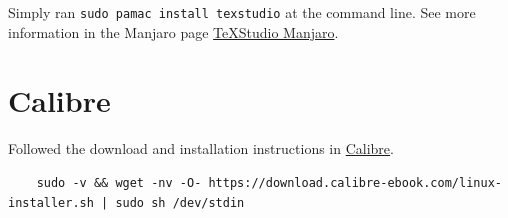 \documentclass[]{scrartcl}
\begin{document}
Simply ran \texttt{sudo pamac install texstudio} at the command line.
See more information in the Manjaro page  \href{https://software.manjaro.org/package/texstudio}{\TeX{}Studio Manjaro}.


\section{Calibre}

Followed the download and installation instructions in \href{https://calibre-ebook.com/download_linux}{Calibre}.

\begin{footnotesize}
\begin{verbatim}
	sudo -v && wget -nv -O- https://download.calibre-ebook.com/linux-installer.sh | sudo sh /dev/stdin
\end{verbatim}
\end{footnotesize}
\end{document}
